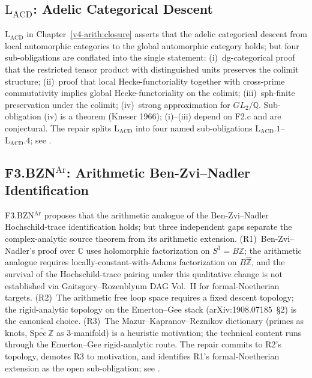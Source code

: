 \subsection{\texorpdfstring{\(\mathrm{L}_{\mathrm{ACD}}\)}{L-ACD}: Adelic Categorical Descent}

\(\mathrm{L}_{\mathrm{ACD}}\) in Chapter~\ref{v4-arith:closure} asserts that
the adelic categorical descent from local automorphic categories to the
global automorphic category holds; but four sub-obligations are conflated
into the single statement:
(i)~dg-categorical proof that the restricted tensor product with
distinguished units preserves the colimit structure;
(ii)~proof that local Hecke-functoriality together with cross-prime
commutativity implies global Hecke-functoriality on the colimit;
(iii)~sph-finite preservation under the colimit;
(iv)~strong approximation for \(GL_{2}/\mathbb{Q}\).
Sub-obligation (iv) is a theorem (Kneser 1966); (i)--(iii) depend on
F2.c and are conjectural.
The repair splits \(\mathrm{L}_{\mathrm{ACD}}\) into four named
sub-obligations \(\mathrm{L}_{\mathrm{ACD}}.1\)--\(\mathrm{L}_{\mathrm{ACD}}.4\);
see .

\subsection{\texorpdfstring{F3.BZN\(^{\mathrm{Ar}}\)}{F3-BZN-Ar}: Arithmetic Ben-Zvi--Nadler Identification}

F3.BZN\(^{\mathrm{Ar}}\) proposes that the arithmetic analogue of the
Ben-Zvi--Nadler Hochschild-trace identification holds; but three
independent gaps separate the complex-analytic source theorem from its
arithmetic extension.
(R1)~Ben-Zvi--Nadler's proof over \(\mathbb{C}\) uses holomorphic
factorization on \(S^{1}=B\mathbb{Z}\); the arithmetic analogue requires
locally-constant-with-Adams factorization on \(B\widehat{\mathbb{Z}}\),
and the survival of the Hochschild-trace pairing under this qualitative
change is not established via Gaitsgory--Rozenblyum DAG Vol.~II for
formal-Noetherian targets.
(R2)~The arithmetic free loop space requires a fixed descent topology;
the rigid-analytic topology on the Emerton--Gee stack (arXiv:1908.07185~\S2)
is the canonical choice.
(R3)~The Mazur--Kapranov--Reznikov dictionary (primes as knots,
\(\overline{\mathrm{Spec}\,\mathbb{Z}}\) as 3-manifold) is a heuristic
motivation; the technical content runs through the
Emerton--Gee rigid-analytic route.
The repair commits to R2's topology, demotes R3 to motivation, and
identifies R1's formal-Noetherian extension as the open sub-obligation;
see .

